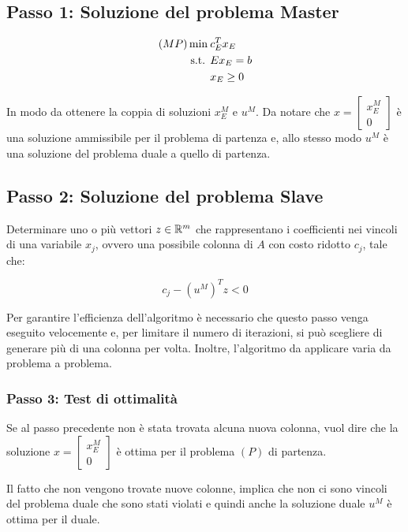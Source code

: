 \subsection{Passo 1: Soluzione del problema Master}

\begin{align*}
(MP) \min \: & c_{E}^Tx_E \\
\text{s.t. }& Ex_E = b \\
&x_E\geq 0
\end{align*}

In modo da ottenere la coppia di soluzioni $x_{E}^M$ e $u^{M}$.
Da notare che $x = \begin{bmatrix}
x_{E}^M\\ 
0
\end{bmatrix}$ è una soluzione ammissibile per il problema di partenza e, allo stesso modo $u^M$ è una soluzione del problema duale a quello di partenza.


\subsection{Passo 2: Soluzione del problema Slave}

Determinare uno o più vettori $z \in \mathbb{R}^m$ che rappresentano i coefficienti nei vincoli di una variabile $x_j$, ovvero una possibile colonna di $A$ con costo ridotto $c_j$, tale che:

$$
c_j - (u^M)^T z < 0
$$

Per garantire l'efficienza dell'algoritmo è necessario che questo passo venga eseguito velocemente e, per limitare il numero di iterazioni, si può scegliere di generare più di una colonna per volta.
Inoltre, l'algoritmo da applicare varia da problema a problema.

\subsubsection{Passo 3: Test di ottimalità}

Se al passo precedente non è stata trovata alcuna nuova colonna, vuol dire che la soluzione $x = \begin{bmatrix}
x_{E}^M\\ 
0
\end{bmatrix}$ è ottima per il problema $(P)$ di partenza.

Il fatto che non vengono trovate nuove colonne, implica che non ci sono vincoli del problema duale che sono stati violati e quindi anche la soluzione duale $u^M$ è ottima per il duale.

